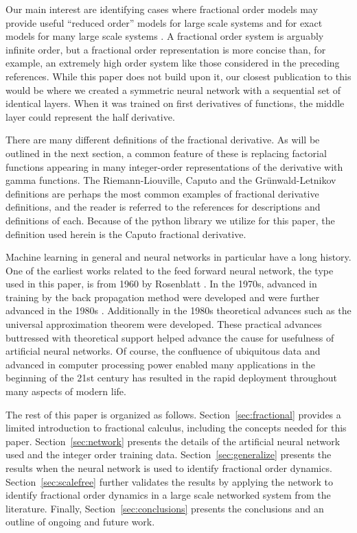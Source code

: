  Our main interest are identifying cases where fractional order models may
  provide useful ``reduced order'' models for large scale systems
  \cite{goodwinemed2023,goodwinemmar2023} and for exact models for many large
  scale systems
  \cite{Goodwine2014Modeling,Leyden2016Using,Leyden2019Large,bg:xnids2022,bg:xninonlinear2020}.
  A fractional order system is arguably infinite order, but a fractional order
  representation is more concise than, for example, an extremely high order
  system like those considered in the preceding references.  While this paper
  does not build upon it, our closest publication to this would be
  \cite{bg:chenSII2022} where we created a symmetric neural network with a
  sequential set of identical layers. When it was trained on first derivatives
  of functions, the middle layer could represent the half derivative. 
 
 There are many different definitions of the fractional derivative. As will be
 outlined in the next section, a common feature of these is replacing factorial
 functions appearing in many integer-order representations of the derivative
 with gamma functions. The Riemann-Liouville, Caputo and the Gr\"unwald-Letnikov
 definitions are perhaps the most common examples of fractional derivative
 definitions, and the reader is referred to the references
 \cite{Machado20111140,4609961,series/lnee/Ortigueira11,das2011functional} for
 descriptions and definitions of each. Because of the python library we utilize
 for this paper, the definition used herein is the Caputo fractional derivative. 

 Machine learning in general and neural networks in particular have a long
 history. One of the earliest works related to the feed forward neural network,
 the type used in this paper, is from 1960 by Rosenblatt \cite{Rosenblatt1960}.
 In the 1970s, advanced in training by the back propagation method were
 developed \cite{linnainmaa1} and were further advanced in the 1980s
 \cite{werbos}.  Additionally in the 1980s theoretical advances such as the
 universal approximation theorem \cite{hornik1989multilayer} were developed.
 These practical advances buttressed with theoretical support helped advance the
 cause for usefulness of artificial neural networks. Of course, the confluence
 of ubiquitous data and advanced in computer processing power enabled many
 applications in the beginning of the 21st century has resulted in the rapid
 deployment throughout many aspects of modern life. 
 

 The rest of this paper is organized as follows. Section~\ref{sec:fractional}
 provides a limited introduction to fractional calculus, including the concepts
 needed for this paper. Section~\ref{sec:network} presents the details of the
 artificial neural network used and the integer order training data.
 Section~\ref{sec:generalize} presents the results when the neural network is
 used to identify fractional order dynamics. Section~\ref{sec:scalefree}
 further validates the results by applying the network to identify fractional
 order dynamics in a large scale networked system from the literature. Finally,
 Section~\ref{sec:conclusions} presents the conclusions and an outline of
 ongoing and future work. 
